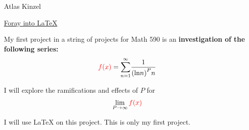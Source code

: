 \documentclass[12pt]{article}
\begin{document}
Atlas Kinzel

\centering

\underline{Foray into \LaTeX}  

My first project in a string of projects for Math 590 is an 
\textbf {investigation of the following series:}
$$ {\color{red}f(x)}={\sum_{n=1}^{\infty}}\frac{1}{{{({\ln}n)}^P}n}$$

I will explore the ramifications and effects of $P$ for $$\lim_{P\to\infty}{\color{red}f(x)}$$

I will use LaTeX on this project. This is only my first project.
\end{document}

